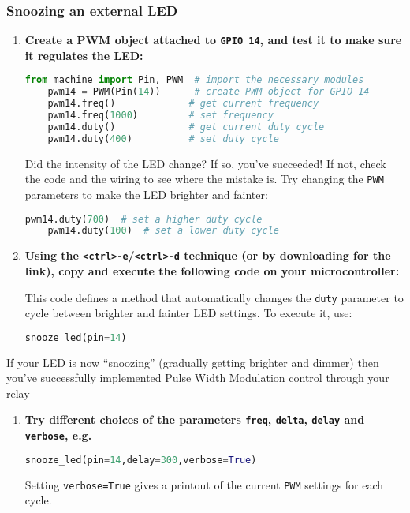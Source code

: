 \subsubsection{\howto Snoozing an external LED}
\begin{enumerate}
	\item \textbf{Create a PWM object attached to \texttt{GPIO 14}, and test it to make sure it regulates the LED:}
	\begin{lstlisting}[language=Python]
	from machine import Pin, PWM  # import the necessary modules
	pwm14 = PWM(Pin(14))      # create PWM object for GPIO 14
	pwm14.freq()             # get current frequency
	pwm14.freq(1000)         # set frequency
	pwm14.duty()             # get current duty cycle
	pwm14.duty(400)          # set duty cycle
	\end{lstlisting}
	Did the intensity of the LED change? 
	If so, you've succeeded!
	If not, check the code and the wiring to see where the mistake is.
	\smallskip
	Try changing the \texttt{PWM} parameters to make the LED brighter and fainter: 
	\begin{lstlisting}[language=Python]
	pwm14.duty(700)  # set a higher duty cycle
	pwm14.duty(100)  # set a lower duty cycle
	\end{lstlisting}
	\item \textbf{Using the \texttt{<ctrl>-e}/\texttt{<ctrl>-d} technique (or by downloading for the link), copy and execute the following code on your microcontroller:}
	
	
	This code defines a method that automatically changes the \texttt{duty} parameter to cycle between brighter and fainter LED settings. 
	To execute it, use:
	\begin{lstlisting}[language=Python]
	snooze_led(pin=14)
	\end{lstlisting}
\end{enumerate}
If your LED is now “snoozing” (gradually getting brighter and dimmer) then you’ve successfully implemented Pulse Width Modulation control through your relay
\begin{enumerate}[resume]
	\item \textbf{Try different choices of the parameters \texttt{freq}, \texttt{delta}, \texttt{delay} and \texttt{verbose}, e.g.} 
	\begin{lstlisting}[language=Python]
	snooze_led(pin=14,delay=300,verbose=True)
	\end{lstlisting}
	Setting \lstinline{verbose=True} gives a printout of the current \texttt{PWM} settings for each cycle.
\end{enumerate}

